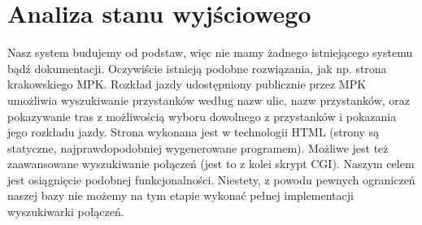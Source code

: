 \section{Analiza stanu wyjściowego}


Nasz system budujemy od podstaw, więc nie mamy żadnego istniejącego systemu bądź dokumentacji. Oczywiście istnieją podobne rozwiązania,
jak np. strona krakowskiego MPK. Rozkład jazdy udostępniony publicznie przez MPK umożliwia wyszukiwanie przystanków według nazw ulic, nazw przystanków, oraz pokazywanie tras z możliwością wyboru dowolnego z przystanków i pokazania jego rozkładu jazdy. Strona wykonana jest w technologii HTML (strony są statyczne, najprawdopodobniej wygenerowane programem). Możliwe jest też zaawansowane wyszukiwanie połączeń (jest to z kolei skrypt CGI). Naszym celem jest osiągnięcie podobnej funkcjonalności. Niestety, z powodu pewnych ograniczeń naszej bazy nie możemy na tym etapie wykonać pełnej implementacji wyszukiwarki połączeń.